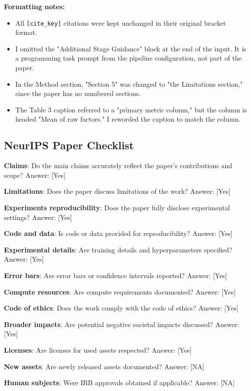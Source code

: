 \documentclass{article}
\begin{document}
\textbf{Formatting notes:}
\begin{itemize}
 \item All \texttt{[cite\_key]} citations were kept unchanged in their original bracket format.
 \item I omitted the "Additional Stage Guidance" block at the end of the input. It is a programming task prompt from the pipeline configuration, not part of the paper.
 \item In the Method section, "Section 5" was changed to "the Limitations section," since the paper has no numbered sections.
 \item The Table 3 caption referred to a "primary metric column," but the column is headed "Mean of raw factors." I reworded the caption to match the column.
\end{itemize}

\subsection{NeurIPS Paper Checklist}

\label{sec:neurips_paper_checklist}

\textbf{Claims}: Do the main claims accurately reflect the paper's contributions and scope?
Answer: [Yes]

\textbf{Limitations}: Does the paper discuss limitations of the work?
Answer: [Yes]

\textbf{Experiments reproducibility}: Does the paper fully disclose experimental settings?
Answer: [Yes]

\textbf{Code and data}: Is code or data provided for reproducibility?
Answer: [Yes]

\textbf{Experimental details}: Are training details and hyperparameters specified?
Answer: [Yes]

\textbf{Error bars}: Are error bars or confidence intervals reported?
Answer: [Yes]

\textbf{Compute resources}: Are compute requirements documented?
Answer: [Yes]

\textbf{Code of ethics}: Does the work comply with the code of ethics?
Answer: [Yes]

\textbf{Broader impacts}: Are potential negative societal impacts discussed?
Answer: [Yes]

\textbf{Licenses}: Are licenses for used assets respected?
Answer: [Yes]

\textbf{New assets}: Are newly released assets documented?
Answer: [NA]

\textbf{Human subjects}: Were IRB approvals obtained if applicable?
Answer: [NA]



\end{document}
